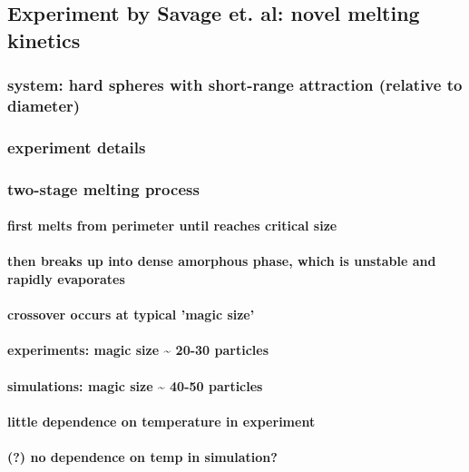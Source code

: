 \documentclass{umthesis}
\begin{document}
\subsection{Experiment by Savage et. al: novel melting kinetics}
\label{sec-2.1.2}
\subsubsection{system: hard spheres with short-range attraction (relative to diameter)}
\label{sec-2.1.2.1}
\subsubsection{experiment details}
\label{sec-2.1.2.2}
\subsubsection{two-stage melting process}
\label{sec-2.1.2.3}
\paragraph{first melts from perimeter until reaches critical size}
\label{sec-2.1.2.3.1}
\paragraph{then breaks up into dense amorphous phase, which is unstable and rapidly evaporates}
\label{sec-2.1.2.3.2}
\paragraph{crossover occurs at typical 'magic size'}
\label{sec-2.1.2.3.3}
\paragraph{experiments: magic size \~{} 20-30 particles}
\label{sec-2.1.2.3.4}
\paragraph{simulations: magic size \~{} 40-50 particles}
\label{sec-2.1.2.3.5}
\paragraph{little dependence on temperature in experiment}
\label{sec-2.1.2.3.6}
\paragraph{(?) no dependence on temp in simulation?}
\label{sec-2.1.2.3.7}
\end{document}
